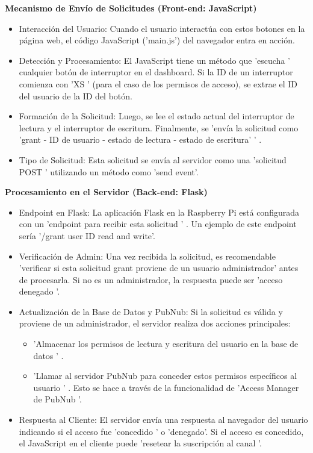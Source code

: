 \documentclass{report}
\begin{document}
\textbf{Mecanismo de Envío de Solicitudes (Front-end: JavaScript)}
\begin{itemize}
    \item Interacción del Usuario:  Cuando el usuario interactúa con estos botones en la página web, el código JavaScript ('main.js') del navegador entra 
    en acción.
    \item Detección y Procesamiento:  El JavaScript tiene un método que  'escucha ' cualquier botón de interruptor en el dashboard. Si la ID de un 
    interruptor comienza con  'XS ' (para el caso de los permisos de acceso), se extrae el ID del usuario de la ID del botón.
    \item Formación de la Solicitud:  Luego, se lee el estado actual del interruptor de lectura y el interruptor de escritura. Finalmente, se  
    'envía la solicitud como 'grant - ID de usuario - estado de lectura - estado de escritura' ' .
    \item Tipo de Solicitud:  Esta solicitud se envía al servidor como una   'solicitud POST '  utilizando un método como 'send event'.
\end{itemize}

\textbf{Procesamiento en el Servidor (Back-end: Flask)}
\begin{itemize}
    \item Endpoint en Flask:  La aplicación Flask en la Raspberry Pi está configurada con un   'endpoint para recibir esta solicitud ' . Un ejemplo de 
    este endpoint sería '/grant user ID read and write'.
    \item Verificación de Admin:  Una vez recibida la solicitud, es recomendable  'verificar si esta solicitud grant proviene de un usuario administrador' 
    antes de procesarla. Si no es un administrador, la respuesta puede ser  'acceso denegado '.
    \item Actualización de la Base de Datos y PubNub:  Si la solicitud es válida y proviene de un administrador, el servidor realiza dos acciones principales:
    \begin{itemize}
        \item  'Almacenar los permisos de lectura y escritura del usuario en la base de datos ' .
        \item  'Llamar al servidor PubNub para conceder estos permisos específicos al usuario ' . Esto se hace a través de la funcionalidad de 
        'Access Manager de PubNub '.
    \end{itemize}
    \item Respuesta al Cliente:  El servidor envía una respuesta al navegador del usuario indicando si el acceso fue  'concedido ' o  'denegado'. 
    Si el acceso es concedido, el JavaScript en el cliente puede  'resetear la suscripción al canal '.
\end{itemize}
\end{document}
